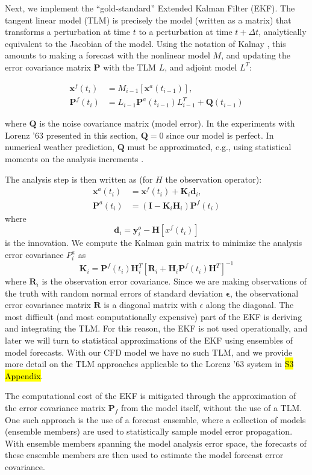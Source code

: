 \documentclass[10pt,letterpaper]{article}
\newcommand{\mbe}{\mathbf{\epsilon}}
\newcommand{\mbx}{\mathbf{x}}
\newcommand{\mby}{\mathbf{y}}
\newcommand{\mbd}{\mathbf{d}}
\newcommand{\mbR}{\mathbf{R}}
\newcommand{\mbH}{\mathbf{H}}
\newcommand{\mbK}{\mathbf{K}}
\newcommand{\mbP}{\mathbf{P}}
\begin{document}
Next, we implement the ``gold-standard'' Extended Kalman Filter (EKF).
The tangent linear model (TLM) is precisely the model (written as a matrix) that transforms a perturbation at time $t$ to a perturbation at time $t+\Delta t$, analytically equivalent to the Jacobian of the model.
Using the notation of Kalnay \cite{kalnay2003}, this amounts to making a forecast with the nonlinear model $M$, and updating the error covariance matrix $\mbP$ with the TLM $L$, and adjoint model $L^T$:

\begin{align*} \mbx^f (t_i) &= M _{i-1} [\mbx ^a (t_{i-1} ) ],\\
\mbP^f (t_i ) &= L_{i-1} \mbP^a (t_{i-1} ) L^T _{i-1} + \mathbf{Q} (t_{i-1} ) \end{align*}

where $\mathbf{Q}$ is the noise covariance matrix (model error).
In the experiments with Lorenz '63 presented in this section, $\mathbf{Q} = 0$ since our model is perfect.
In numerical weather prediction, $\mathbf{Q}$ must be approximated, e.g., using statistical moments on the analysis increments \cite{danforth2007estimating,li2009accounting,danforth2008using}.

The analysis step is then written as (for $H$ the observation operator):
\begin{align} \mbx^a (t_i ) &= \mbx^f (t_i) + \mbK_i \mbd_i,\\
\mbP^a (t_i) &= (\mathbf{I} - \mbK_i \mbH_i )\mbP^f (t_i) \end{align}
where
\[ \mbd_i = \mby_i^o - \mbH[x^f (t_i) ] \]
is the innovation. We compute the Kalman gain matrix to minimize the analysis error covariance $P^a _i$ as
\[ \mbK_i = \mbP^f (t_i) \mbH_i ^T [ \mbR_i + \mbH_i \mbP^f (t_i) \mbH^T ] ^{-1} \]
where $\mbR_i$ is the observation error covariance.
Since we are making observations of the truth with random normal errors of standard deviation $\mbe$, the observational error covariance matrix $\mbR$ is a diagonal matrix with $\epsilon$ along the diagonal.
The most difficult (and most computationally expensive) part of the EKF is deriving and integrating the TLM.
For this reason, the EKF is not used operationally, and later we will turn to statistical approximations of the EKF using ensembles of model forecasts.
With our CFD model we have no such TLM, and we provide more detail on the TLM approaches applicable to the Lorenz '63 system in \hl{S3 Appendix}.

The computational cost of the EKF is mitigated through the approximation of the error covariance matrix $\mbP_f$ from the model itself, without the use of a TLM.
One such approach is the use of a forecast ensemble, where a collection of models (ensemble members) are used to statistically sample model error propagation.
With ensemble members spanning the model analysis error space, the forecasts of these ensemble members are then used to estimate the model forecast error covariance.
\end{document}
